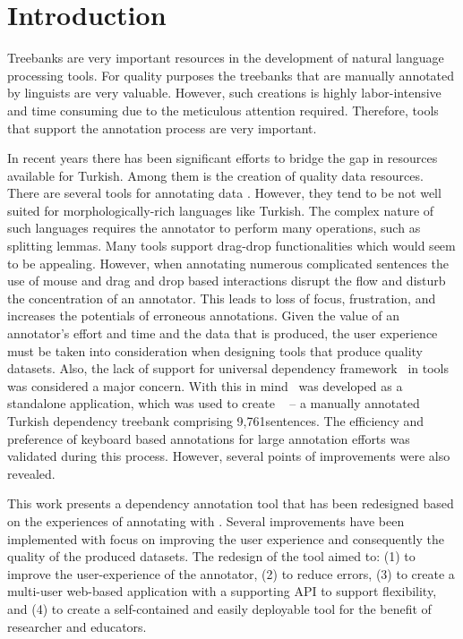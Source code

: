 \section{Introduction}
\label{sec:introduction}

Treebanks are very important resources in the development of natural language processing tools.
For quality purposes the treebanks that are manually annotated by linguists are very valuable. 
However, such creations  is highly labor-intensive and time consuming due to the meticulous attention required.
Therefore, tools that support the annotation process are very important. 

In recent years there has been significant efforts to bridge the gap in resources available for Turkish. 
Among them is the creation of quality data resources. 
There are several tools for annotating data \cite{brat}\cite{dgannotator}. 
However, they tend to be not well suited for morphologically-rich languages like Turkish.
The complex nature of such languages requires the annotator to perform many operations, such as splitting lemmas.
Many tools support drag-drop functionalities which would seem to be appealing. 
However, when annotating numerous complicated sentences the use of mouse and drag and drop based interactions disrupt the flow and disturb the concentration of an annotator. 
This leads to loss of focus, frustration, and increases the potentials of erroneous annotations.
Given the value of an annotator's effort and time and the data that is produced, the user experience must be taken into consideration when designing tools that produce quality datasets. 
Also, the lack of support for universal dependency framework~\cite{UD-main} in tools was considered a major concern.
With this in mind \boatvone\ was developed as a standalone application, which was used to create \bountreebank~\cite{turk-etal-2019-turkish,trk2020resources,UD-Boun-Treebank} -- a manually annotated Turkish dependency treebank comprising 9,761sentences.
The efficiency and preference of keyboard based annotations for large annotation efforts was validated during this process. 
However, several points of improvements were also revealed.  

This work presents a dependency annotation tool that has been redesigned based on the experiences of annotating with \boatvone.
Several improvements have been implemented with focus on improving the user experience and consequently the quality of the produced datasets.
The redesign of the tool aimed to: (1) to improve the user-experience of the annotator, (2) to reduce errors, (3) to create a multi-user web-based application with a supporting API to support flexibility, and (4) to create a self-contained and easily deployable tool for the benefit of researcher and educators. 

